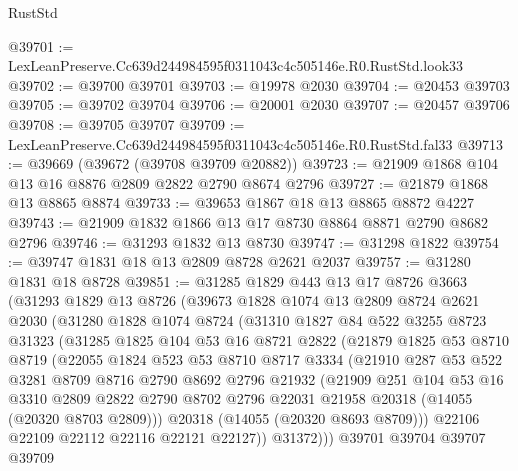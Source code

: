 \begin{lexlean}{RustStd}
\begin{coremodule}
@39701 := LexLeanPreserve.Cc639d244984595f0311043c4c505146e.R0.RustStd.look33
@39702 := @39700 @39701
@39703 := @19978 @2030
@39704 := @20453 @39703
@39705 := @39702 @39704
@39706 := @20001 @2030
@39707 := @20457 @39706
@39708 := @39705 @39707
@39709 := LexLeanPreserve.Cc639d244984595f0311043c4c505146e.R0.RustStd.fal33
@39713 := @39669 (@39672 (@39708 @39709 @20882))
@39723 := @21909 @1868 @104 @13 @16 @8876 @2809 @2822 @2790 @8674 @2796
@39727 := @21879 @1868 @13 @8865 @8874
@39733 := @39653 @1867 @18 @13 @8865 @8872 @4227
@39743 := @21909 @1832 @1866 @13 @17 @8730 @8864 @8871 @2790 @8682 @2796
@39746 := @31293 @1832 @13 @8730
@39747 := @31298 @1822
@39754 := @39747 @1831 @18 @13 @2809 @8728 @2621 @2037
@39757 := @31280 @1831 @18 @8728
@39851 := @31285
    @1829
    @443
    @13
    @17
    @8726
    @3663
    (@31293
      @1829
      @13
      @8726
      (@39673
        @1828
        @1074
        @13
        @2809
        @8724
        @2621
        @2030
        (@31280
          @1828
          @1074
          @8724
          (@31310
            @1827
            @84
            @522
            @3255
            @8723
            @31323
            (@31285
              @1825
              @104
              @53
              @16
              @8721
              @2822
              (@21879
                @1825
                @53
                @8710
                @8719
                (@22055
                  @1824
                  @523
                  @53
                  @8710
                  @8717
                  @3334
                  (@21910
                    @287
                    @53
                    @522
                    @3281
                    @8709
                    @8716
                    @2790
                    @8692
                    @2796
                    @21932
                    (@21909
                      @251
                      @104
                      @53
                      @16
                      @3310
                      @2809
                      @2822
                      @2790
                      @8702
                      @2796
                      @22031
                      @21958
                      @20318
                      (@14055 (@20320 @8703 @2809)))
                    @20318
                    (@14055 (@20320 @8693 @8709)))
                  @22106
                  @22109
                  @22112
                  @22116
                  @22121
                  @22127))
              @31372)))
        @39701
        @39704
        @39707
        @39709

\end{coremodule}
\end{lexlean}
